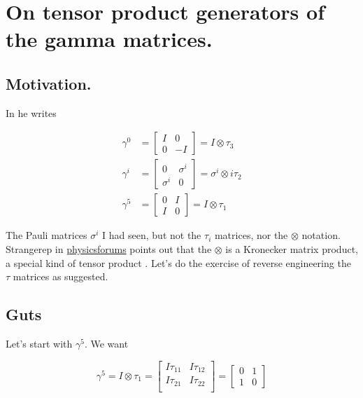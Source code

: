 %
%

\chapter{On tensor product generators of the gamma matrices.}
\label{chap:zeeTauMatrix}
{}
\date{June 20, 2011}

\beginArtNoToc

\section{Motivation.}

In \cite{zee2005quantum} he writes

\begin{align*}
\gamma^0 &=
\begin{bmatrix}
I & 0 \\
0 & -I
\end{bmatrix}
=
I \otimes \tau_3 \\
\gamma^i &=
\begin{bmatrix}
0 & \sigma^i \\
\sigma^i & 0
\end{bmatrix}
=
\sigma^i \otimes i \tau_2 \\
\gamma^5 &=
\begin{bmatrix}
0 & I \\
I & 0
\end{bmatrix}
=
I \otimes \tau_1
\end{align*}

The Pauli matrices $\sigma^i$ I had seen, but not the $\tau_i$ matrices, nor the $\otimes$ notation.  Strangerep in \href{http://www.physicsforums.com/showthread.php?p=3365680\#post3365680}{physicsforums} points out that the $\otimes$ is a Kronecker matrix product, a special kind of tensor product \cite{wiki:tensorProduct}.  Let's do the exercise of reverse engineering the $\tau$ matrices as suggested.

\section{Guts}

Let's start with $\gamma^5$.  We want 

\begin{equation}\label{eqn:zeeTauMatrix:10}
\gamma^5 = I \otimes \tau_1 =
\begin{bmatrix}
I \tau_{11} & I \tau_{12} \\
I \tau_{21} & I \tau_{22} \\
\end{bmatrix}
= 
\begin{bmatrix}
0 & 1 \\
1 & 0
\end{bmatrix}
\end{equation}

